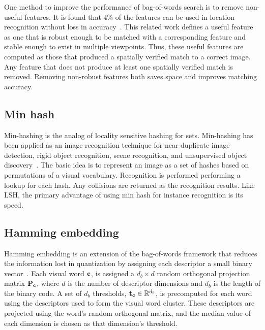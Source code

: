             One method to improve the performance of bag-of-words search is to remove non-useful features. It is
            found that $4\percent$ of the features can be used in location recognition without loss in
            accuracy~\cite{turcot_better_2009}. This related work defines a useful feature as one that is robust
            enough to be matched with a corresponding feature and stable enough to exist in multiple viewpoints.
            Thus, these useful features are computed as those that produced a spatially verified match to a correct
            image. Any feature that does not produce at least one spatially verified match is removed. Removing
            non-robust features both saves space and improves matching accuracy.

    \subsection{Min hash}
        Min-hashing is the analog of locality sensitive hashing for sets. Min-hashing has been applied as an image
        recognition technique for near-duplicate image detection, rigid object recognition, scene recognition, and
        unsupervised object discovery~\cite{chum_near_2008, zhang_image_2011, romberg_robust_2012,
        romberg_bundle_2013, chum_geometric_2009, chum_large_scale_2010, chum_fast_2012, wang_semi_supervised_2012}.
        The basic idea is to represent an image as a set of hashes based on permutations of a visual vocabulary.
        Recognition is performed performing a lookup for each hash. Any collisions are returned as the recognition
        results. Like LSH, the primary advantage of using min hash for instance recognition is its speed.

    \subsection{Hamming embedding}
        Hamming embedding is an extension of the bag-of-words framework that reduces the information lost in
        quantization by assigning each descriptor a small binary vector~\cite{jegou_hamming_2008,
        jegou_burstiness_2009, jegou_improving_2010}. Each visual word $\mathbf{c}$, is assigned a $d_b \times d$ random
        orthogonal projection matrix $\mathbf{P}_{\mathbf{c}}$, where $d$ is the number of descriptor dimensions and $d_b$ is
        the length of the binary code. A set of $d_b$ thresholds, $\mathbf{t}_{\mathbf{c}} \in \mathbb{R}^{d_b}$, is precomputed for
        each word using the descriptors used to form the visual word cluster. These descriptors are projected using
        the word's random orthogonal matrix, and the median value of each dimension is chosen as that dimension's
        threshold.


